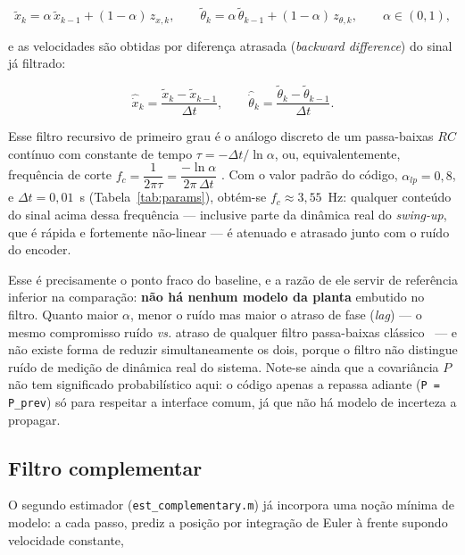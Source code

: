 \documentclass[brazil, 12pt]{article}
\begin{document}
\[
\tilde x_k = \alpha\,\tilde x_{k-1} + (1-\alpha)\,z_{x,k},
\qquad
\tilde\theta_k = \alpha\,\tilde\theta_{k-1} + (1-\alpha)\,z_{\theta,k},
\qquad \alpha\in(0,1),
\]

e as velocidades são obtidas por diferença atrasada (\emph{backward
difference}) do sinal já filtrado:

\[
\hat{\dot x}_k = \frac{\tilde x_k - \tilde x_{k-1}}{\Delta t},
\qquad
\hat{\dot\theta}_k = \frac{\tilde\theta_k - \tilde\theta_{k-1}}{\Delta t}.
\]

Esse filtro recursivo de primeiro grau é o análogo discreto de um passa-baixas
$RC$ contínuo com constante de tempo $\tau = -\Delta t/\ln\alpha$, ou,
equivalentemente, frequência de corte
$f_c = \dfrac{1}{2\pi\tau} = \dfrac{-\ln\alpha}{2\pi\,\Delta t}$
\cite{oppenheim}. %
Com o valor padrão do código, $\alpha_{lp}=0{,}8$, e $\Delta t = 0{,}01$~s
(Tabela~\ref{tab:params}), obtém-se $f_c \approx 3{,}55$~Hz: qualquer conteúdo do
sinal acima dessa frequência — inclusive parte da dinâmica real do
\emph{swing-up}, que é rápida e fortemente não-linear — é atenuado e atrasado
junto com o ruído do encoder.

Esse é precisamente o ponto fraco do baseline, e a razão de ele servir de
referência inferior na comparação: \textbf{não há nenhum modelo da planta}
embutido no filtro. Quanto maior $\alpha$, menor o ruído mas maior o atraso de
fase (\emph{lag}) — o mesmo compromisso ruído \emph{vs.} atraso de qualquer
filtro passa-baixas clássico~\cite{oppenheim} — e não existe forma de reduzir
simultaneamente os dois, porque o filtro não distingue ruído de medição de
dinâmica real do sistema. Note-se ainda que a covariância $P$ não tem
significado probabilístico aqui: o código apenas a repassa adiante
(\texttt{P = P\_prev}) só para respeitar a interface comum, já que não há
modelo de incerteza a propagar.

\subsection{Filtro complementar}
\label{sec:complementar}

O segundo estimador (\texttt{est\_complementary.m}) já incorpora uma noção
mínima de modelo: a cada passo, prediz a posição por integração de Euler à
frente supondo velocidade constante,
\end{document}
